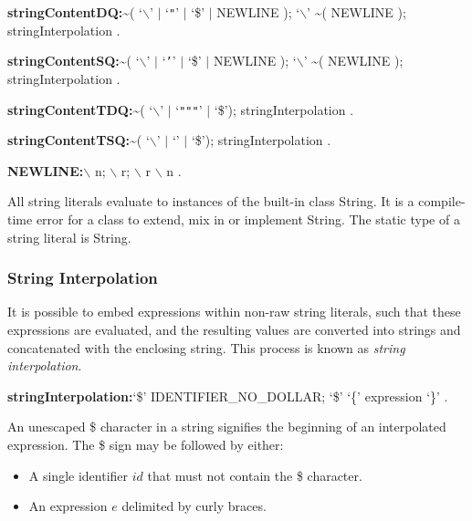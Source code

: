 \documentclass{article}
\newcommand{\code}[1]{{\sf #1}}
\begin{document}
\begin{grammar}
 {\bf stringContentDQ:}\~{}( `$\backslash$' $|$ `{\escapegrammar \texttt{"}}' $|$ `\$' $|$ NEWLINE );
      `$\backslash$'  \~{}( NEWLINE );
     stringInterpolation
    .

 {\bf stringContentSQ:}\~{}( `$\backslash$' $|$ `{\escapegrammar \texttt{'}}' $|$ `\$' $|$ NEWLINE );
      `$\backslash$'  \~{}( NEWLINE );
     stringInterpolation
    .


 {\bf stringContentTDQ:}\~{}( `$\backslash$' $|$  `{\escapegrammar \texttt{"""}}' $|$ `\$');
     stringInterpolation
    .

 {\bf stringContentTSQ:}\~{}( `$\backslash$' $|$ `{\escapegrammar \code{'}\code{'}\code{'}}' $|$ `\$');
     stringInterpolation
    .

{\bf NEWLINE:}$\backslash$ n;
      $\backslash$ r;
      $\backslash$ r $\backslash$ n
    .

 \end{grammar}

\LMHash{}
All string literals evaluate to instances of the built-in class \code{String}.
It is a compile-time error for a class to extend, mix in or implement \code{String}.
The static type of a string literal is \code{String}.

\subsubsection{String Interpolation}

\LMHash{}
It is possible to embed expressions within non-raw string literals, such that these expressions are evaluated, and the resulting values are converted into strings and concatenated with the enclosing string. This process is known as {\em string interpolation}.

 \begin{grammar}
{\bf stringInterpolation:}`\$' IDENTIFIER\_NO\_DOLLAR;
      `\$' `\{' expression `\}' %
    .
 \end{grammar}


\LMHash{}
An unescaped \$ character in a string signifies the beginning of an interpolated expression.  The \$ sign may be followed by either:
\begin{itemize}
\item A single identifier $id$ that must not contain the \$ character.
\item An expression $e$ delimited by curly braces.
\end{itemize}
\end{document}
